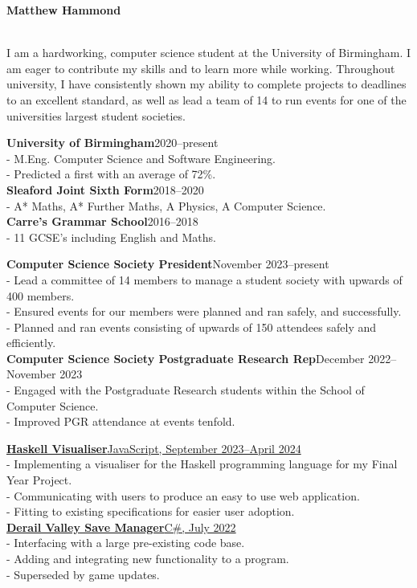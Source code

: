 \documentclass[twoside]{article}
\begin{document}
\begin{center}
    \noindent\huge\textbf{Matthew Hammond}
\end{center}\hr
{}
\hfill
{}\\
\hfill
{}\hr
I am a hardworking, computer science student at the University of Birmingham. I am eager to contribute my skills and to learn more while working. Throughout university, I have consistently shown my ability to complete projects to deadlines to an excellent standard, as well as lead a team of 14 to run events for one of the universities largest student societies.

\textbf{University of Birmingham}\hfill 2020--present\\
- M.Eng. Computer Science and Software Engineering.\\
- Predicted a first with an average of 72\%.\\
\textbf{Sleaford Joint Sixth Form}\hfill 2018--2020\\
- A* Maths, A* Further Maths, A Physics, A Computer Science.\\
\textbf{Carre’s Grammar School}\hfill 2016--2018\\
- 11 GCSE's including English and Maths.

\textbf{Computer Science Society President}\hfill November 2023--present\\
- Lead a committee of 14 members to manage a student society with upwards of 400 members.\\
- Ensured events for our members were planned and ran safely, and successfully.\\
- Planned and ran events consisting of upwards of 150 attendees safely and efficiently.\\
\textbf{Computer Science Society Postgraduate Research Rep}\hfill December 2022--November 2023\\
- Engaged with the Postgraduate Research students within the School of Computer Science.\\
- Improved PGR attendance at events tenfold.

\href{https://github.com/FrozenDude101/masters-project}{\textbf{Haskell Visualiser}\hfill JavaScript, September 2023--April 2024}\\
- Implementing a visualiser for the Haskell programming language for my Final Year Project.\\
- Communicating with users to produce an easy to use web application.\\
- Fitting to existing specifications for easier user adoption.\\
\href{https://github.com/FrozenDude101/DV-SaveManager}{\textbf{Derail Valley Save Manager}\hfill C\#, July 2022}\\
- Interfacing with a large pre-existing code base.\\
- Adding and integrating new functionality to a program.\\
- Superseded by game updates.
\end{document}
